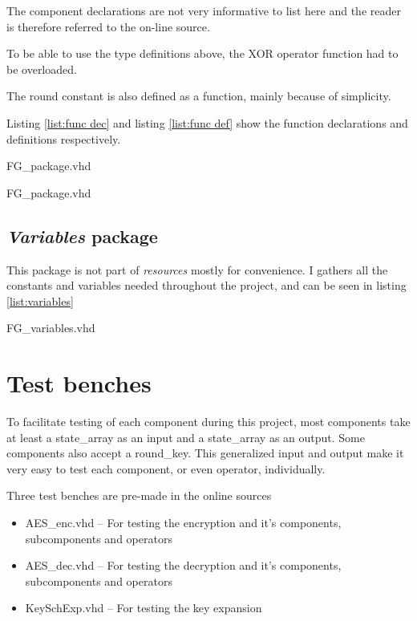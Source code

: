 \documentclass[report.tex]{subfiles}
\begin{document}
The component declarations are not very informative to list here and the reader is therefore referred to the on-line source.

To be able to use the type definitions above, the XOR operator function had to be overloaded.

The round constant is also defined as a function, mainly because of simplicity.

Listing \ref{list:func dec} and listing \ref{list:func def} show the function declarations and definitions respectively.


{FG_package.vhd}


{FG_package.vhd}
\subsection{\emph{Variables} package}
This package is not part of \emph{resources} mostly for convenience. I gathers all the constants and variables needed throughout the project, and can be seen in listing \ref{list:variables}


{FG_variables.vhd}

\section{Test benches}

To facilitate testing of each component during this project, most components take at least a state\_array as an input and a state\_array as an output. Some components also accept a round\_key. This generalized input and output make it very easy to test each component, or even operator, individually.

Three test benches are pre-made in the online sources
\begin{itemize}
\item AES\_enc.vhd -- For testing the encryption and it's components, subcomponents and operators
\item AES\_dec.vhd -- For testing the decryption and it's components, subcomponents and operators
\item KeySchExp.vhd -- For testing the key expansion
\end{itemize}
\end{document}
